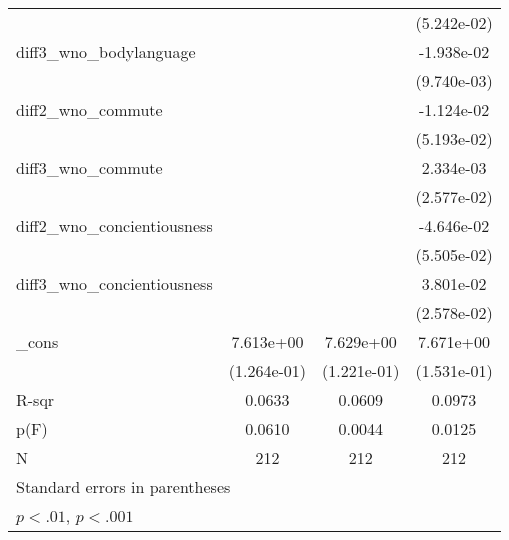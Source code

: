 {\begin{tabular}{l*{3}{c}}
                                    &                       &                       & (5.242e-02)           \\
    \addlinespace
    diff3\_wno\_bodylanguage        &                       &                       & -1.938e-02            \\
                                    &                       &                       & (9.740e-03)           \\
    \addlinespace
    diff2\_wno\_commute             &                       &                       & -1.124e-02            \\
                                    &                       &                       & (5.193e-02)           \\
    \addlinespace
    diff3\_wno\_commute             &                       &                       & 2.334e-03             \\
                                    &                       &                       & (2.577e-02)           \\
    \addlinespace
    diff2\_wno\_concientiousness    &                       &                       & -4.646e-02            \\
                                    &                       &                       & (5.505e-02)           \\
    \addlinespace
    diff3\_wno\_concientiousness    &                       &                       & 3.801e-02             \\
                                    &                       &                       & (2.578e-02)           \\
    \addlinespace
    \_cons                          & 7.613e+00\sym{**}     & 7.629e+00\sym{**}     & 7.671e+00\sym{**}     \\
                                    & (1.264e-01)           & (1.221e-01)           & (1.531e-01)           \\
    \midrule
    R-sqr                           & 0.0633                & 0.0609                & 0.0973                \\
    p(F)                            & 0.0610                & 0.0044                & 0.0125                \\
    N                               & 212                   & 212                   & 212                   \\
    \bottomrule
    \multicolumn{4}{l}{\footnotesize Standard errors in parentheses}                                        \\
    \multicolumn{4}{l}{\footnotesize \sym{*} \(p<.01\), \sym{**} \(p<.001\)}                                \\
\end{tabular}
}
